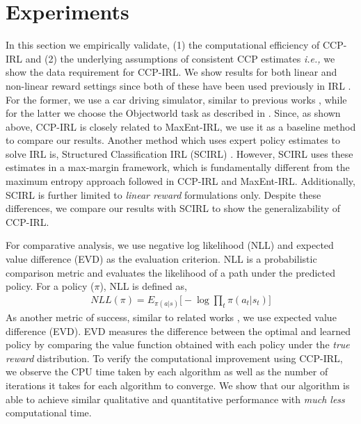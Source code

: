 \documentclass{article}
\begin{document}
\section{Experiments}

In this section we empirically validate, (1) the computational efficiency of CCP-IRL and (2) the underlying assumptions of consistent CCP estimates \emph{i.e.,} we show the data requirement for CCP-IRL.
We show results for both linear and non-linear reward settings since both of these have been used previously in IRL \cite{ziebart2010modeling, wulfmeier2015maximum}. For the former, we use a car driving simulator, similar to previous works \cite{abbeel2004apprenticeship, klein2012inverse}, while for the latter we choose the Objectworld task as described in \cite{Levine2013}.
Since, as shown above, CCP-IRL is closely related to MaxEnt-IRL, we use it as a baseline method to compare our results. 
Another method which uses expert policy estimates to solve IRL is, Structured Classification IRL (SCIRL) \cite{klein2012inverse}. However, SCIRL uses these estimates in a max-margin framework, which is fundamentally different from the maximum entropy approach followed in CCP-IRL and MaxEnt-IRL. Additionally, SCIRL is further limited to \textit{linear reward} formulations only. Despite these differences, we compare our results with SCIRL to show the generalizability of CCP-IRL.

For comparative analysis, we use negative log likelihood (NLL) \cite{kitani2012activity} and expected value difference (EVD) \cite{levine2011nonlinear} as the evaluation criterion. NLL is a probabilistic comparison metric and evaluates the likelihood of a path under the predicted policy. For a policy ($\pi$), NLL is defined as,
\begin{align}
NLL(\pi) = E_{\pi(a|s)}\big[-\log \prod_{t} \pi(a_{t}|s_{t}) \big]
\end{align}
As another metric of success, similar to related works \cite{Levine2013, wulfmeier2015maximum}, we use expected value difference (EVD). EVD measures the difference between the optimal and learned policy by comparing the value function obtained with each policy under the \textit{true reward} distribution.
To verify the computational improvement using CCP-IRL, we observe the CPU time taken by each algorithm as well as the number of iterations it takes for each algorithm to converge. We show that our algorithm is able to achieve similar qualitative and quantitative performance with \textit{much less} computational time.
\end{document}
